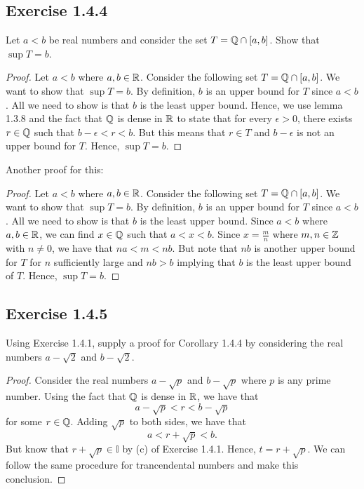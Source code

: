     \subsection{Exercise 1.4.4}
    Let \( a < b \) be real numbers and consider the set \( T = \mathbb{Q} \cap [a,b]\). Show that \( \sup T = b \). 

        \begin{proof}
            Let \( a < b \) where \( a,b \in \mathbb{R} \). Consider the following set \( T = \mathbb{Q} \cap [a,b] \). We want to show that \( \sup T = b \). By definition, \( b \) is an upper bound for \( T \) since \( a < b \). All we need to show is that \( b \) is the least upper bound. Hence, we use lemma 1.3.8 and the fact that \( \mathbb{Q} \) is dense in \( \mathbb{R}  \) to state that for every \( \epsilon > 0 \), there exists \( r \in \mathbb{Q} \) such that \( b - \epsilon < r < b \). But this means that \( r \in T \) and \( b - \epsilon \) is not an upper bound for \( T \). Hence, \( \sup T = b \).


        \end{proof}
    

    Another proof for this: 

        \begin{proof}
            Let \( a < b \) where \( a,b \in \mathbb{R} \). Consider the following set \( T = \mathbb{Q} \cap [a,b] \). We want to show that \( \sup T = b \). By definition, \( b \) is an upper bound for \( T \) since \( a < b \). All we need to show is that \( b \) is the least upper bound. Since \( a < b \) where \( a,b \in \mathbb{R} \), we can find \(x \in \mathbb{Q} \) such that \( a < x < b \). Since \( x = \frac{m}{n}\) where \( m,n \in \mathbb{Z} \) with \( n \neq 0 \), we have that \( na < m < nb\). But note that \( nb \) is another upper bound for \( T \) for \( n \) sufficiently large and \( nb > b \) implying that \( b \) is the least upper bound of \( T \). Hence, \( \sup T = b \).
        \end{proof}
    

    \subsection{Exercise 1.4.5}

    Using Exercise 1.4.1, supply a proof for Corollary 1.4.4 by considering the real numbers \( a - \sqrt{2} \) and \( b - \sqrt{2}\). 

        \begin{proof}
            Consider the real numbers \( a - \sqrt{p}\) and \( b - \sqrt{p}\) where \( p \) is any prime number. Using the fact that \( \mathbb{Q} \) is dense in \( \mathbb{R} \), we have that 
            \[ a - \sqrt{p} < r < b - \sqrt{p} \] 
            for some \( r \in \mathbb{Q} \). Adding \( \sqrt{p} \) to both sides, we have that 
            \[ a < r + \sqrt{p} < b .\]
            But know that \( r + \sqrt{p} \in \mathbb{I} \) by (c) of Exercise 1.4.1. Hence, \( t = r + \sqrt{p} \). We can follow the same procedure for trancendental numbers and make this conclusion. 
        \end{proof}
    


